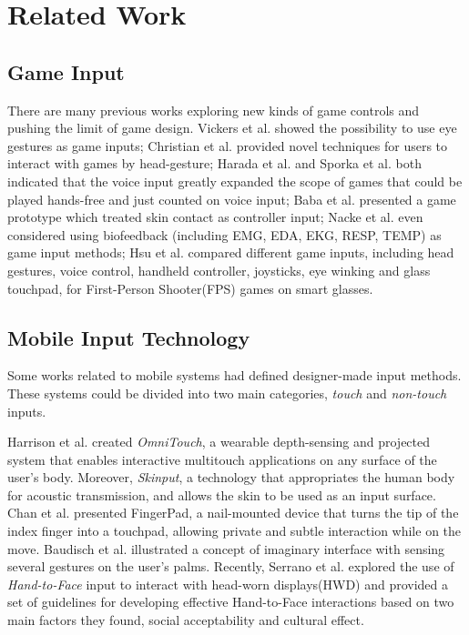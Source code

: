 \chapter{Related Work}
\label{c:related work}
\section{Game Input}

    There are many previous works exploring new kinds of game controls and pushing the limit of game design. Vickers et al.\cite{Vickers:2013:PLT:2531922.2514856} showed the possibility to use eye gestures as game inputs; Christian et al.\cite{Christian:2014:VSI:2559206.2580103} provided novel techniques for users to interact with games by head-gesture; 
    Harada et al.\cite{Harada:2011:VGI:2042053.2042059} and Sporka et al.\cite{Sporka:2006:NIS:1168987.1169023} both indicated that the voice input greatly expanded the scope of games that could be played hands-free and just counted on voice input; 
    Baba et al.\cite{Baba:2007:VGU:1278280.1278285} presented a game prototype which treated skin contact as controller input; Nacke et al.\cite{Nacke:2011:BGD:1978942.1978958} even considered using biofeedback (including EMG, EDA, EKG, RESP, TEMP) as game input methods;
    Hsu et al.\cite{Hsu:2014:GSE:2663204.2669623} compared different game inputs, including head gestures, voice control, handheld controller, joysticks, eye winking and glass touchpad, for First-Person Shooter(FPS) games on smart glasses. 


    \section{Mobile Input Technology}
    Some works related to mobile systems had defined designer-made input methods. These systems could be divided into two main categories, \emph{touch} and \emph{non-touch} inputs. 

    Harrison et al.\cite{Harrison:2011:OWM:2047196.2047255} created \textsl{OmniTouch}, a wearable depth-sensing and projected system that enables interactive multitouch applications on any surface of the user's body. Moreover, \textsl{Skinput}\cite{Harrison:2010:SAB:1753326.1753394}, a technology that appropriates the human body for acoustic transmission, and allows the skin to be used as an input surface. Chan et al. presented FingerPad\cite{Chan:2013:FPS:2501988.2502016}, a nail-mounted device that turns the tip of the index finger into a touchpad, allowing private and subtle interaction while on the move. Baudisch et al.\cite{Gustafson:2011:IPL:2047196.2047233} illustrated a concept of imaginary interface with sensing several gestures on the user's palms. Recently, Serrano et al.\cite{Serrano:2014:EUH:2611247.2556984} explored the use of \textsl{Hand-to-Face} input to interact with head-worn displays(HWD) and provided a set of guidelines for developing effective Hand-to-Face interactions based on two main factors they found, social acceptability and cultural effect.

